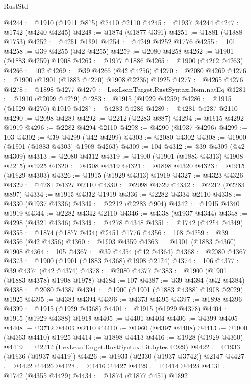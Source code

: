 \begin{lexlean}{RustStd}
\begin{coremodule}
@4244 := @1910 (@1911 @875) @3410 @2110
@4245 := @1937 @4244
@4247 := @1742 (@4240 @4245)
@4249 := @1874 (@1877 @391)
@4251 := @1881 (@1888 @1753)
@4252 := @4251 @1891
@4254 := @4249 @4252 @1776
@4255 := 101
@4258 := @39 @4255 (@42 @4255)
@4259 := @2080 @4258
@4262 := @1901 (@1883 @4259) @1908
@4263 := @1977 @1886
@4265 := @1900 (@4262 @4263)
@4266 := 102
@4269 := @39 @4266 (@42 @4266)
@4270 := @2080 @4269
@4276 := @1900 (@1901 (@1883 @4270) @1908 @2236) @1925
@4277 := @4265 @4276
@4278 := @1898 @4277
@4279 := LexLeanTarget.RustSyntax.Item.natEq
@4281 := @1910 (@2099 @4279)
@4283 := @1915 (@1929 @4259)
@4286 := @1915 (@1929 @4270) @1919
@4287 := @4283 @4286
@4289 := @4281 @4287 @2110
@4290 := @2098 @4289
@4292 := @2212 (@2283 @887)
@4294 := @1915 @4292 @1919
@4296 := @2282 @4294 @2110
@4298 := @4290 (@1937 @4296)
@4299 := 103
@4302 := @39 @4299 (@42 @4299)
@4303 := @2080 @4302
@4308 := @1900 (@1901 (@1883 @4303) @1908 @4263)
@4309 := 104
@4312 := @39 @4309 (@42 @4309)
@4313 := @2080 @4312
@4319 := @1900 (@1901 (@1883 @4313) @1908 @2215) @1925
@4320 := @4308 @4319
@4321 := @1898 @4320
@4323 := @1915 (@1929 @4303)
@4326 := @1915 (@1929 @4313) @1919
@4327 := @4323 @4326
@4329 := @4281 @4327 @2110
@4330 := @2098 @4329
@4332 := @2212 (@2283 @897)
@4334 := @1915 @4332 @1919
@4336 := @2282 @4334 @2110
@4338 := @4330 (@1937 @4336)
@4340 := @2212 (@2283 @904)
@4342 := @1915 @4340 @1919
@4344 := @2282 @4342 @2110
@4346 := @4338 (@1937 @4344)
@4348 := @4298 (@4321 @4346)
@4349 := @4278 @4348
@4351 := @1742 (@4254 @4349)
@4355 := @1874 (@1877 @434) @2451 @1776
@4356 := 108
@4359 := @39 @4356 (@42 @4356)
@4360 := @1903 @4359
@4363 := @1901 (@1883 @4360) @1908
@4364 := 105
@4367 := @39 @4364 (@42 @4364)
@4368 := @2080 @4367
@4373 := @1900 (@1901 (@1883 @4368) @1908 @2124)
@4374 := 106
@4377 := @39 @4374 (@42 @4374)
@4378 := @2080 @4377
@4383 := @1900 (@1901 (@1883 @4378) @1908 @1978)
@4384 := 107
@4387 := @39 @4384 (@42 @4384)
@4388 := @2080 @4387
@4394 := @1900 (@1901 (@1883 @4388) @1908 @2029) @1925
@4395 := @4383 @4394
@4396 := @4373 @4395
@4397 := @1898 @4396
@4399 := @1915 (@1929 @4368)
@4401 := @1915 (@1929 @4378)
@4404 := @1915 (@1929 @4388) @1919
@4405 := @4401 @4404
@4406 := @4399 @4405
@4408 := @3712 @4406 @2110
@4410 := @1960 (@4397 @4408)
@4413 := @1900 (@4363 @4410) @1925
@4414 := @1898 @4413
@4416 := @1928 (@1929 @4360)
@4419 := @2212 (LexLeanTarget.RustSyntax.Lit.bytes @929)
@4422 := @1933 (@1936 (@1937 @4419))
@4426 := @1933 (@2330 (@1937 @3742)) @2147
@4427 := @4422 @4426
@4428 := @4416 @4427
@4429 := @4414 @4428
@4431 := @1742 (@4355 @4429)
@4434 := @1874 (@1877 @451) @1892

\end{coremodule}
\end{lexlean}
